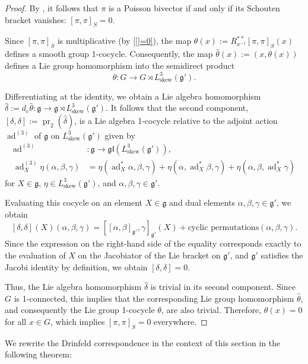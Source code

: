 \documentclass[11pt,reqno]{amsart}
\theoremstyle{definition}
\numberwithin{equation}{section}
\begin{document}
\begin{proof}
By \cite[Theorem 3.6]{22}, it follows that $\pi$ is a Poisson bivector if and only if its Schouten bracket vanishes: $[\pi, \pi]_S = 0$.

Since $[\pi, \pi]_S$ is multiplicative (by \cref{[]=0}), the map $\theta(x) := R_{x^{-1}}^{**}[\pi, \pi]_S(x)$ defines a smooth group 1-cocycle. Consequently, the map $\hat{\theta}(x) := (x, \theta(x))$ defines a Lie group homomorphism into the semidirect product
\[
\hat{\theta} : G \rightarrow G \rtimes L^3_{\text{skew}}(\mathfrak{g}').
\]

Differentiating at the identity, we obtain a Lie algebra homomorphism $\hat{\delta} := d_e \hat{\theta} : \mathfrak{g} \rightarrow \mathfrak{g} \rtimes L^3_{\text{skew}}(\mathfrak{g}')$. It follows that the second component, $[\delta, \delta] := \operatorname{pr}_2(\hat{\delta})$, is a Lie algebra 1-cocycle relative to the adjoint action $\operatorname{ad}^{(3)}$ of $\mathfrak{g}$ on $L^3_{\text{skew}}(\mathfrak{g}')$ given by 
\begin{align*}
\operatorname{ad}^{(3)} &: \mathfrak{g} \to \mathfrak{gl}(L^3_{\text{skew}}(\mathfrak{g}')), \\
\operatorname{ad}^{(3)}_X \eta (\alpha, \beta, \gamma) &= \eta(\operatorname{ad}^*_X \alpha, \beta, \gamma) + \eta(\alpha, \operatorname{ad}^*_X \beta, \gamma) + \eta(\alpha, \beta, \operatorname{ad}^*_X \gamma)
\end{align*}
for $X \in \mathfrak{g}$, $\eta \in L^3_{\text{skew}}(\mathfrak{g}')$, and $\alpha, \beta, \gamma \in \mathfrak{g}'$. 

Evaluating this cocycle on an element $X \in \mathfrak{g}$ and dual elements $\alpha, \beta, \gamma \in \mathfrak{g}'$, we obtain
\[
[\delta, \delta](X)(\alpha, \beta, \gamma) = [ [\alpha, \beta]_{\mathfrak{g}'}, \gamma]_{\mathfrak{g}'} (X) + \text{cyclic permutations}(\alpha, \beta, \gamma).
\]
Since the expression on the right-hand side of the equality corresponds exactly to the evaluation of $X$ on the Jacobiator of the Lie bracket on $\mathfrak{g}'$, and $\mathfrak{g}'$ satisfies the Jacobi identity by definition, we obtain $[\delta, \delta] = 0$. 

Thus, the Lie algebra homomorphism $\hat{\delta}$ is trivial in its second component. Since $G$ is 1-connected, this implies that the corresponding Lie group homomorphism $\hat{\theta}$, and consequently the Lie group 1-cocycle $\theta$, are also trivial. Therefore, $\theta(x) = 0$ for all $x \in G$, which implies $[\pi, \pi]_S = 0$ everywhere.
\end{proof}
 We rewrite the Drinfeld correspondence in the context of this section in the following theorem:
\end{document}
